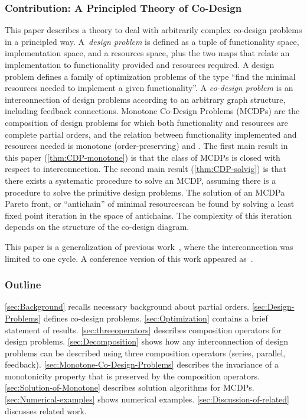 \subsubsection{Contribution: A Principled Theory of Co-Design}

This paper describes a theory to deal with arbitrarily complex co-design
problems in a principled way. A~\emph{design problem} is defined
as a tuple of functionality space, implementation space, and a resources
space, plus the two maps that relate an implementation to functionality
provided and resources required. A design problem defines a family
of optimization problems of the type ``find the minimal resources
needed to implement a given functionality''. A \emph{co-design problem}
is an interconnection of design problems according to an arbitrary
graph structure, including feedback connections. Monotone Co-Design
Problems (MCDPs) are the composition of design problems for which
both functionality and resources are complete partial orders, and
the relation between functionality implemented and resources needed
is monotone (order-preserving) and \scottcontinuous. The first main
result in this paper (\cref{thm:CDP-monotone}) is that the
class of MCDPs is closed with respect to interconnection. The second
main result (\cref{thm:CDP-solvig}) is that there exists
a systematic procedure to solve an MCDP, assuming there is a procedure
to solve the primitive design problems. The solution of an MCDP\textemdash a
Pareto front, or ``antichain'' of minimal resources\textemdash can
be found by solving a least fixed point iteration in the space of
antichains. The complexity of this iteration depends on the structure
of the co-design diagram.

This paper is a generalization of previous work~\cite{censi15monotone},
where the interconnection was limited to one cycle. A conference
version of this work appeared as~\cite{censi15same}.

 

\subsubsection{Outline}

\cref{sec:Background} recalls necessary background about partial orders.
\cref{sec:Design-Problems} defines co-design problems. \cref{sec:Optimization}
contains a brief statement of results. \cref{sec:threeoperators} describes
composition operators for design problems. \cref{sec:Decomposition}
shows how any interconnection of design problems can be described
using three composition operators (series, parallel, feedback). \cref{sec:Monotone-Co-Design-Problems}
describes the invariance of a monotonicity property that is preserved
by the composition operators. \cref{sec:Solution-of-Monotone} describes
solution algorithms for MCDPs. \cref{sec:Numerical-examples} shows
numerical examples. \cref{sec:Discussion-of-related} discusses related
work.



